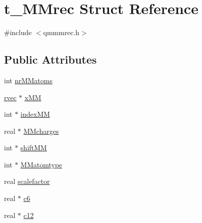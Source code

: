 \hypertarget{structt__MMrec}{\section{t\-\_\-\-M\-Mrec \-Struct \-Reference}
\label{structt__MMrec}
}


{\ttfamily \#include $<$qmmmrec.\-h$>$}

\subsection*{\-Public \-Attributes}
\begin{DoxyCompactItemize}
\item 
int \hyperlink{structt__MMrec_a3f8160d9fba2bcbedfcfbf7b46c7553d}{nr\-M\-Matoms}
\item 
\hyperlink{share_2template_2gromacs_2types_2simple_8h_aa02a552a4abd2f180c282a083dc3a999}{rvec} $\ast$ \hyperlink{structt__MMrec_a50ce80694ff92753ed6a17c0b81502a4}{x\-M\-M}
\item 
int $\ast$ \hyperlink{structt__MMrec_a6a123f34e483ea9181e8be494eb63151}{index\-M\-M}
\item 
real $\ast$ \hyperlink{structt__MMrec_a74a7f42f73e3abd49fc6acbc4e1381bc}{\-M\-Mcharges}
\item 
int $\ast$ \hyperlink{structt__MMrec_a9e1216571387bb1f3892811612782c8e}{shift\-M\-M}
\item 
int $\ast$ \hyperlink{structt__MMrec_a1f7240711799769238ddb66fd7447b44}{\-M\-Matomtype}
\item 
real \hyperlink{structt__MMrec_a318d8786448d57ac9762aab4a3ae27af}{scalefactor}
\item 
real $\ast$ \hyperlink{structt__MMrec_a82f809edd38e1413e62f5cf8da999da8}{c6}
\item 
real $\ast$ \hyperlink{structt__MMrec_aebf029e648231762c6362ee995f2290c}{c12}
\end{DoxyCompactItemize}


